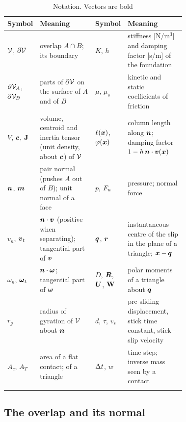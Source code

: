 \begin{table}[t]
\caption{Notation. Vectors are bold}\label{tab:notation}
\footnotesize
\begin{tabular}{@{}lp{0.36\linewidth}lp{0.36\linewidth}@{}}
\toprule
Symbol & Meaning & Symbol & Meaning \\
\midrule
$\mathcal{V}$, $\partial\mathcal{V}$ & overlap $A\cap B$; its boundary &
$K$, $h$ & stiffness [N/m$^3$] and damping factor [s/m] of the foundation \\
$\partial\mathcal{V}_A$, $\partial\mathcal{V}_B$ & parts of $\partial\mathcal{V}$ on the surface of $A$ and of $B$ &
$\mu$, $\mu_s$ & kinetic and static coefficients of friction \\
$V$, $\boldsymbol{c}$, $\mathbf{J}$ & volume, centroid and inertia tensor (unit density, about $\boldsymbol{c}$) of $\mathcal{V}$ &
$\ell(\boldsymbol{x})$, $\varphi(\boldsymbol{x})$ & column length along $\boldsymbol{n}$; damping factor $1 - h\,\boldsymbol{n}\cdot\boldsymbol{v}(\boldsymbol{x})$ \\
$\boldsymbol{n}$, $\boldsymbol{m}$ & pair normal (pushes $A$ out of $B$); unit normal of a face &
$p$, $F_n$ & pressure; normal force \\
$v_n$, $\boldsymbol{v}_t$ & $\boldsymbol{n}\cdot\boldsymbol{v}$ (positive when separating); tangential part of $\boldsymbol{v}$ &
$\boldsymbol{q}$, $\boldsymbol{r}$ & instantaneous centre of the slip in the plane of a triangle; $\boldsymbol{x} - \boldsymbol{q}$ \\
$\omega_n$, $\boldsymbol{\omega}_t$ & $\boldsymbol{n}\cdot\boldsymbol{\omega}$; tangential part of $\boldsymbol{\omega}$ &
$D$, $\boldsymbol{R}$, $\boldsymbol{U}$, $\mathbf{W}$ & polar moments of a triangle about $\boldsymbol{q}$ \\
$r_g$ & radius of gyration of $\mathcal{V}$ about $\boldsymbol{n}$ &
$d$, $\tau$, $v_s$ & pre-sliding displacement, stick time constant, stick--slip velocity \\
$A_c$, $A_T$ & area of a flat contact; of a triangle &
$\Delta t$, $w$ & time step; inverse mass seen by a contact \\
\botrule
\end{tabular}
\end{table}

\subsection{The overlap and its normal}\label{sec:geometry}

